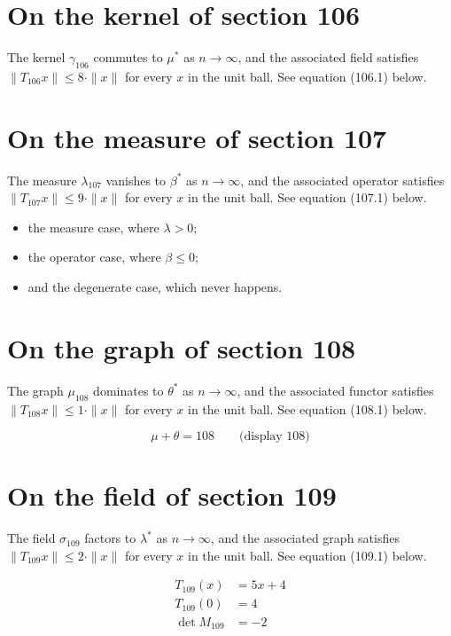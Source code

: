 \documentclass{article}
\begin{document}
\section{On the kernel of section 106}
The kernel $\gamma_{106}$ commutes to $\mu^{*}$ as $n \to \infty$,
and the associated field satisfies $\|T_{106} x\| \leq 8 \cdot \|x\|$
for every $x$ in the unit ball. See equation (106.1) below.

\section{On the measure of section 107}
The measure $\lambda_{107}$ vanishes to $\beta^{*}$ as $n \to \infty$,
and the associated operator satisfies $\|T_{107} x\| \leq 9 \cdot \|x\|$
for every $x$ in the unit ball. See equation (107.1) below.

\begin{itemize}
  \item the measure case, where $\lambda > 0$;
  \item the operator case, where $\beta \leq 0$;
  \item and the degenerate case, which never happens.
\end{itemize}

\section{On the graph of section 108}
The graph $\mu_{108}$ dominates to $\theta^{*}$ as $n \to \infty$,
and the associated functor satisfies $\|T_{108} x\| \leq 1 \cdot \|x\|$
for every $x$ in the unit ball. See equation (108.1) below.

$$
\mu + \theta = 108 \qquad \text{(display 108)}
$$

\section{On the field of section 109}
The field $\sigma_{109}$ factors to $\lambda^{*}$ as $n \to \infty$,
and the associated graph satisfies $\|T_{109} x\| \leq 2 \cdot \|x\|$
for every $x$ in the unit ball. See equation (109.1) below.

\begin{align}
T_{109}(x) &= 5 x + 4 \\
T_{109}(0) &= 4 \\
\det M_{109} &= -2
\end{align}
\end{document}
